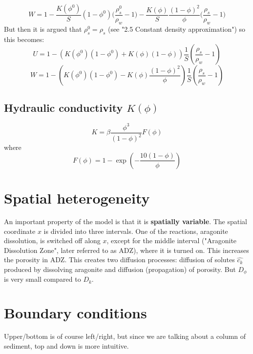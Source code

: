 \documentclass[11pt, letterpaper]{article}
\begin{document}
\begin{equation}
    W = 1 - \frac{K(\phi^0)}{S}(1-\phi^0) \big(\frac{\rho_s^0}{\rho_w}-1) - \frac{K(\phi)}{S} \frac{(1-\phi)^2}{\phi}\big(\frac{\rho_s}{\rho_w}-1\big)
\end{equation}
But then it is argued that $\rho_s^0 = \rho_s$ (see "2.5 Constant density approximation") so this becomes:
\begin{equation}
    U = 1 - \left(K(\phi^0)(1-\phi^0) + K(\phi)(1-\phi)\right) \frac{1}{S}\left(\frac{\rho_s}{\rho_w}-1\right)
\end{equation}
\begin{equation}
    W = 1 - \left(K(\phi^0)(1-\phi^0) - K(\phi) \frac{(1-\phi)^2}{\phi}\right)\frac{1}{S}\left(\frac{\rho_s}{\rho_w}-1\right)
\end{equation}

\subsection{Hydraulic conductivity $K(\phi)$}

\begin{equation}
    K = \beta \frac{\phi^3}{(1 - \phi)^2}F(\phi)
\end{equation}
where
\begin{equation}
    F(\phi) = 1 - \exp\left( -\frac{10(1-\phi)}{\phi} \right)
\end{equation}

\section{Spatial heterogeneity}

An important property of the model is that it is \textbf{spatially variable}. The spatial coordinate $x$ is divided into three intervals. One of the reactions, aragonite dissolution, is switched off along $x$, except for the middle interval ("Aragonite Dissolution Zone", later referred to as ADZ), where it is turned on. This increases the porosity in ADZ. This creates two diffusion processes: diffusion of solutes $\hat{c_k}$ produced by dissolving aragonite and diffusion (propagation) of porosity. But $D_{\phi}$ is very small compared to $D_k$.

\section{Boundary conditions}
Upper/bottom is of course left/right, but since we are talking about a column of sediment, top and down is more intuitive.
\end{document}
